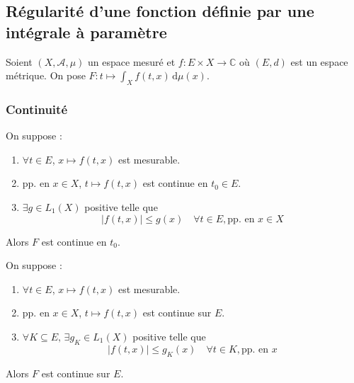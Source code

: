 




  \subsection{Régularité d'une fonction définie par une intégrale à paramètre}

  Soient $(X, \mathcal{A}, \mu)$ un espace mesuré et $f : E \times X \rightarrow \mathbb{C}$ où $(E, d)$ est un espace métrique. On pose $F : t \mapsto \int_X f(t, x) \, \mathrm{d}\mu(x)$.

  \subsubsection{Continuité}


  \begin{theorem}
    On suppose :
    \begin{enumerate}[label={\bfseries(\roman*)}]
      \item $\forall t \in E$, $x \mapsto f(t,x)$ est mesurable.
      \item pp. en $x \in X$, $t \mapsto f(t,x)$ est continue en $t_0 \in E$.
      \item $\exists g \in L_1(X)$ positive telle que
      \[ |f(t,x)| \leq g(x) \quad \forall t \in E, \text{pp. en } x \in X \]
    \end{enumerate}
    Alors $F$ est continue en $t_0$.
  \end{theorem}

  \begin{corollary}
    On suppose :
    \begin{enumerate}[label={\bfseries(\roman*)}]
      \item $\forall t \in E$, $x \mapsto f(t,x)$ est mesurable.
      \item pp. en $x \in X$, $t \mapsto f(t,x)$ est continue sur $E$.
      \item $\forall K \subseteq E, \, \exists g_K \in L_1(X)$ positive telle que
      \[ |f(t,x)| \leq g_K(x) \quad \forall t \in K, \text{pp. en } x \]
    \end{enumerate}
    Alors $F$ est continue sur $E$.
  \end{corollary}

